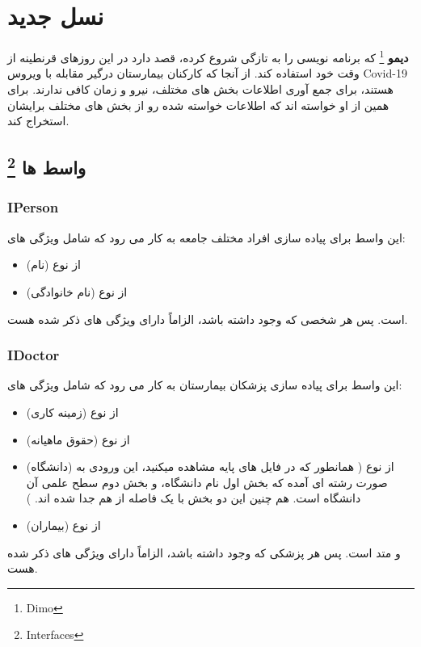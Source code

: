 
    \section{
    نسل جدید
    \grayBox{\textcolor{purple}{C\#}}
    }
    \textbf{دیمو}
    \footnote{Dimo}
    که برنامه نویسی را به تازگی شروع کرده، قصد دارد در این روزهای قرنطینه از وقت خود استفاده کند.
    از آنجا که کارکنان بیمارستان درگیر مقابله با ویروس Covid-19
    هستند، برای جمع آوری اطلاعات بخش های مختلف، نیرو و زمان کافی ندارند.
    برای همین از او خواسته اند که اطلاعات خواسته شده رو از بخش های مختلف برایشان استخراج کند.
    \subsection{
    واسط ها
    \footnote{Interfaces}
    }
        \subsubsection{IPerson}
        این واسط برای پیاده سازی افراد مختلف جامعه به کار می رود که شامل ویژگی های:
        \begin{itemize}
        \item 
            (نام)
             از نوع 
            \grayBox{\textcolor{blue}{string}} 
        \item
            (نام خانوادگی)
            از نوع
            \grayBox{\textcolor{blue}{string}}
        \end{itemize}
        است.
        پس هر شخصی که وجود داشته باشد، الزاماً دارای ویژگی های ذکر شده هست.
        
        \subsubsection{IDoctor}
        این واسط برای پیاده سازی پزشکان بیمارستان به کار می رود که شامل ویژگی های:
        \begin{itemize}
        \item 
            (زمینه کاری)
             از نوع 
            \grayBox{\textcolor{blue}{string}} 
        \item
            (حقوق ماهیانه)
            از نوع
            \grayBox{\textcolor{blue}{long}}
        \item
            (دانشگاه)
            از نوع
            \grayBox{\textcolor{blue}{string}}
            (
            همانطور که در فایل های پایه مشاهده میکنید، این ورودی به صورت رشته ای آمده که بخش اول نام دانشگاه، و بخش دوم سطح علمی آن دانشگاه است. هم چنین این دو بخش با یک فاصله از هم جدا شده اند.
            )
        \item
             (بیماران)
             از نوع
             \grayBox{\textcolor{blue}{List<Patient>}}
        \end{itemize}
        و متد 
        است.
        پس هر پزشکی که وجود داشته باشد، الزاماً دارای ویژگی های ذکر شده هست.
